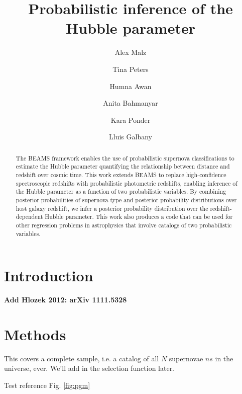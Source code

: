 \documentclass[12pt, onecolumn]{emulateapj}
\begin{document}
\title{Probabilistic inference of the Hubble parameter}

\author{Alex Malz}
\author{Tina Peters}
\author{Humna Awan}
\author{Anita Bahmanyar}
\author{Kara Ponder}
\author{Lluis Galbany}

\begin{abstract}
The BEAMS framework enables the use of probabilistic supernova classifications to estimate the Hubble parameter quantifying the relationship between distance and redshift over cosmic time.  This work extends BEAMS to replace high-confidence spectroscopic redshifts with probabilistic photometric redshifts, enabling inference of the Hubble parameter as a function of two probabilistic variables.  By combining posterior probabilities of supernova type and posterior probability distributions over host galaxy redshift, we infer a posterior probability distribution over the redshift-dependent Hubble parameter.  This work also produces a code that can be used for other regression problems in astrophysics that involve catalogs of two probabilistic variables.
\end{abstract}

\keywords{}

\section{Introduction}
\label{sec:intro}

\citet{kunz_bayesian_2007, kelly_flexible_2008}

{\bf Add Hlozek 2012: arXiv 1111.5328}

\section{Methods}
\label{sec:meth}

This covers a complete sample, i.e. a catalog of all $N$ supernovae $ns$ in the universe, ever.  We'll add in the selection function later.

Test reference Fig. \ref{fig:pgm}
\end{document}
